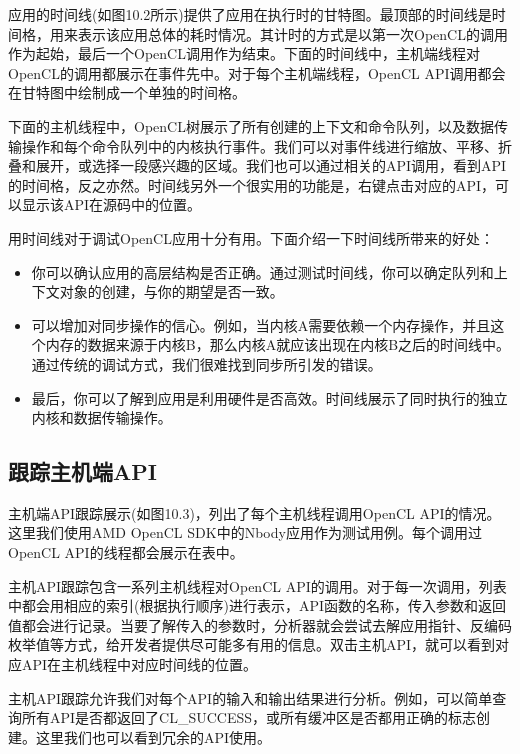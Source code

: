 应用的时间线(如图10.2所示)提供了应用在执行时的甘特图。最顶部的时间线是时间格，用来表示该应用总体的耗时情况。其计时的方式是以第一次OpenCL的调用作为起始，最后一个OpenCL调用作为结束。下面的时间线中，主机端线程对OpenCL的调用都展示在事件先中。对于每个主机端线程，OpenCL API调用都会在甘特图中绘制成一个单独的时间格。


下面的主机线程中，OpenCL树展示了所有创建的上下文和命令队列，以及数据传输操作和每个命令队列中的内核执行事件。我们可以对事件线进行缩放、平移、折叠和展开，或选择一段感兴趣的区域。我们也可以通过相关的API调用，看到API的时间格，反之亦然。时间线另外一个很实用的功能是，右键点击对应的API，可以显示该API在源码中的位置。

用时间线对于调试OpenCL应用十分有用。下面介绍一下时间线所带来的好处：

\begin{itemize}
\item 你可以确认应用的高层结构是否正确。通过测试时间线，你可以确定队列和上下文对象的创建，与你的期望是否一致。
\item 可以增加对同步操作的信心。例如，当内核A需要依赖一个内存操作，并且这个内存的数据来源于内核B，那么内核A就应该出现在内核B之后的时间线中。通过传统的调试方式，我们很难找到同步所引发的错误。
\item 最后，你可以了解到应用是利用硬件是否高效。时间线展示了同时执行的独立内核和数据传输操作。
\end{itemize}

\subsection{跟踪主机端API}

主机端API跟踪展示(如图10.3)，列出了每个主机线程调用OpenCL API的情况。这里我们使用AMD OpenCL SDK中的Nbody应用作为测试用例。每个调用过OpenCL API的线程都会展示在表中。


主机API跟踪包含一系列主机线程对OpenCL API的调用。对于每一次调用，列表中都会用相应的索引(根据执行顺序)进行表示，API函数的名称，传入参数和返回值都会进行记录。当要了解传入的参数时，分析器就会尝试去解应用指针、反编码枚举值等方式，给开发者提供尽可能多有用的信息。双击主机API，就可以看到对应API在主机线程中对应时间线的位置。

主机API跟踪允许我们对每个API的输入和输出结果进行分析。例如，可以简单查询所有API是否都返回了CL\_\allowbreak{}SUCCESS，或所有缓冲区是否都用正确的标志创建。这里我们也可以看到冗余的API使用。

